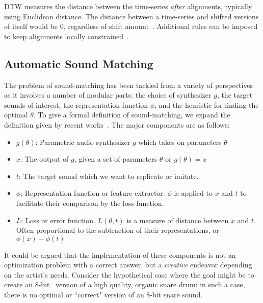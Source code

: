 \documentclass[lettersize,journal]{IEEEtran}
\newcommand{\highlight}[1]{\textcolor[RGB]{00,100,100}{#1}}
\begin{document}
DTW measures the distance between the time-series \textit{after} alignments, typically using Euclidean distance. The distance between a time-series and shifted versions of itself would be 0, regardless of shift amount~\cite{tavenard.blog.dtw}. Additional rules can be imposed to keep alignments locally constrained~\cite{itakura1975minimum,sakoe1978dynamic}.


\subsection{Automatic Sound Matching}
\label{sec:sound_matching_definition}
The problem of sound-matching has been tackled from a variety of perspectives as it involves a number of modular parts: the choice of synthesizer $g$, the target sounds of interest, the representation function $\phi$, and the heuristic for finding the optimal $\theta$. To give a formal definition of sound-matching, we expand the definition given by recent works~\cite{vahidi2023mesostructures,han2023perceptual}. The major components are as follows: 
\begin{itemize}
    \item $g(\theta)$: Parametric audio synthesizer $g$ which takes on parameters $\theta$ 
    \item $x$: The output of $g$, given a set of parameters $\theta$ or $g(\theta) = x$ 
    \item $t$: The target sound which we want to replicate or imitate. 
    \item $\phi$: Representation function or feature extractor. $\phi$ is applied to $x$ and $t$ to facilitate their comparison by the loss function.
    \item $L$: Loss or error function. $L(\theta,t)$ is a measure of distance between $x$ and $t$. Often proportional to the subtraction of their representations, or $ \phi(x) - \phi(t)$
\end{itemize}

\highlight{It could be argued that the implementation of these components is not an optimization problem with a correct answer, but a \textit{creative} endeavor depending on the artist's needs}. Consider the hypothetical case where the goal might be to create an 8-bit~\cite{collins2007loop} version of a high quality, organic snare drum: in such a case, there is no optimal or ``correct" version of an 8-bit snare sound. 
\end{document}
